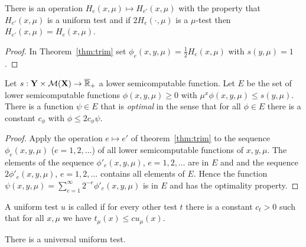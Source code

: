 \begin{corollary}\label{coroll:trim}
There is an operation \( H_{e}(x,\mu)\mapsto H_{e'}(x,\mu) \) with the property
that \( H_{e'}(x,\mu) \) is a uniform test and if \( 2 H_{e}(\cdot,\mu) \) is a \( \mu \)-test
then \( H_{e'}(x,\mu)=H_{e}(x,\mu) \).
\end{corollary}
 \begin{proof}
In Theorem~\ref{thm:trim} set \( \phi_{e}(x,y,\mu)=\frac{1}{2}H_{e}(x,\mu) \) with
\( s(y,\mu)=1 \).
 \end{proof}

\begin{corollary}\label{coroll:trim-univ}
Let \( s:\mathbf{Y}\times\mathcal{M}(\mathbf{X})\to\overline{\mathbb{R}}_{+} \) a lower semicomputable
function.
Let \( E \) be the set of 
lower semicomputable functions \( \phi(x,y,\mu)\ge 0 \) with
\( \mu^{x}\phi(x,y,\mu)\le s(y,\mu) \).
There is a function \( \psi\in E \) that is \emph{optimal} in the sense
that for all \( \phi\in E \) there is a constant \( c_{\phi} \) with 
\( \phi\le 2c_{\phi}\psi \).
\end{corollary}
 \begin{proof}
Apply the operation \( e\mapsto e' \) of theorem~\ref{thm:trim} to the sequence
\( \phi_{e}(x,y,\mu) \) (\( e=1,2,\dots \)) of all lower semicomputable
functions of \( x,y,\mu \).
The elements of the sequence \( \phi'_{e}(x,y,\mu) \), \( e=1,2,\dots \)  are in \( E \) and
and the sequence \( 2\phi'_{e}(x,y,\mu) \), \( e=1,2,\dots \) contains all
elements of \( E \).
Hence 
the function \( \psi(x,y,\mu)=\sum_{e=1}^{\infty}2^{-e} \phi'_{e}(x,y,\mu) \) is in
\( E \) and has the optimality property.
 \end{proof}

 \begin{definition}
  \label{def:g4.1.4}
A uniform test \( u \) is called  if for every other test \( t \) there
is a constant \( c_{t}>0 \) such that for all \( x,\mu \) we have \( t_{\mu}(x) \le c u_{\mu}(x) \). 
 \end{definition}

\begin{theorem}
  \label{thm:g4.1.2}
There is a universal uniform test.
\end{theorem}

